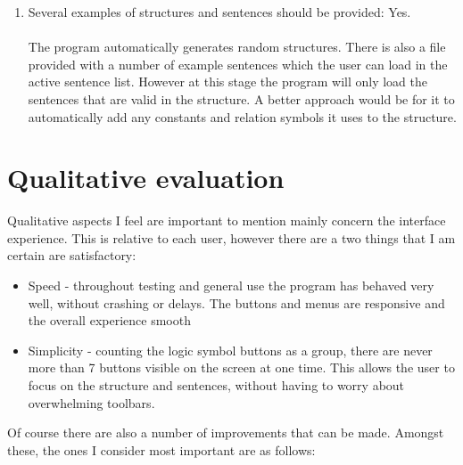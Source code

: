 \documentclass{report}
\begin{document}
\begin{enumerate}
\item Several examples of structures and sentences should be provided: Yes.
\\ \\
The program automatically generates random structures. There is also a file 
provided with a number of example sentences which the user can load in the 
active sentence list. However at this stage the program will only load the 
sentences that are valid in the structure. A better approach would be for it to 
automatically add any constants and relation symbols it uses to the structure. 
\end{enumerate}

\section{Qualitative evaluation}
Qualitative aspects I feel are important to mention mainly concern the interface 
experience. This is relative to each user, however there are a two things that I 
am certain are satisfactory:
\begin{itemize}
\item Speed - throughout testing and general use the program has behaved very 
well, without crashing or delays. The buttons and menus are responsive and the 
overall experience smooth
\item Simplicity - counting the logic symbol buttons as a group, there are never 
more than 7 buttons visible on the screen at one time. This allows the user to 
focus on the structure and sentences, without having to worry about overwhelming 
toolbars. 
\end{itemize}

\noindent Of course there are also a number of improvements that can be made. 
Amongst these, the ones I consider most important are as follows:
\end{document}

